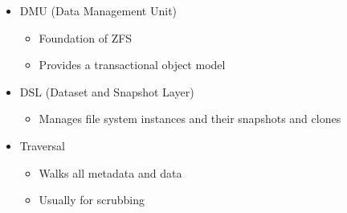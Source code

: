\begin{frame}[fragile]
\begin{columns}[c]
\begin{itemize}
        \item DMU (Data Management Unit)
      \begin{itemize}
          \item Foundation of ZFS
          \item Provides a transactional object model
      \end{itemize}

        \item DSL (Dataset and Snapshot Layer)
      \begin{itemize}
          \item Manages file system instances and their snapshots and clones
      \end{itemize}

        \item Traversal
      \begin{itemize}
          \item Walks all metadata and data 
          \item Usually for scrubbing
      \end{itemize}
    \end{itemize}

\end{columns}

\end{frame}
% 
% 

